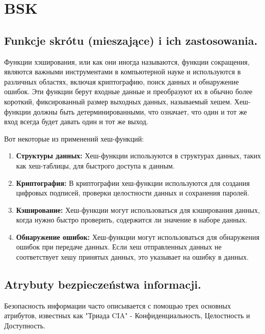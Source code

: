 \chapter{BSK}
\section{Funkcje skrótu (mieszające) i ich zastosowania. }
Функции хэширования, или как они иногда называются, функции сокращения, являются важными инструментами в компьютерной науке и используются в различных областях, включая криптографию, поиск данных и обнаружение ошибок. Эти функции берут входные данные и преобразуют их в обычно более короткий, фиксированный размер выходных данных, называемый хешем. Хеш-функции должны быть детерминированными, что означает, что один и тот же вход всегда будет давать один и тот же выход.

Вот некоторые из применений хеш-функций:

\begin{enumerate}
\item \textbf{Структуры данных:} Хеш-функции используются в структурах данных, таких как хеш-таблицы, для быстрого доступа к данным.
\item \textbf{Криптография:} В криптографии хеш-функции используются для создания цифровых подписей, проверки целостности данных и сохранения паролей.
\item \textbf{Кэширование:} Хеш-функции могут использоваться для кэширования данных, когда нужно быстро проверить, содержится ли значение в наборе данных.
\item \textbf{Обнаружение ошибок:} Хеш-функции могут использоваться для обнаружения ошибок при передаче данных. Если хеш отправленных данных не соответствует хешу принятых данных, это указывает на ошибку в данных.
\end{enumerate}

\section{Atrybuty bezpieczeństwa informacji.}

Безопасность информации часто описывается с помощью трех основных атрибутов, известных как "Триада CIA" - Конфиденциальность, Целостность и Доступность.

